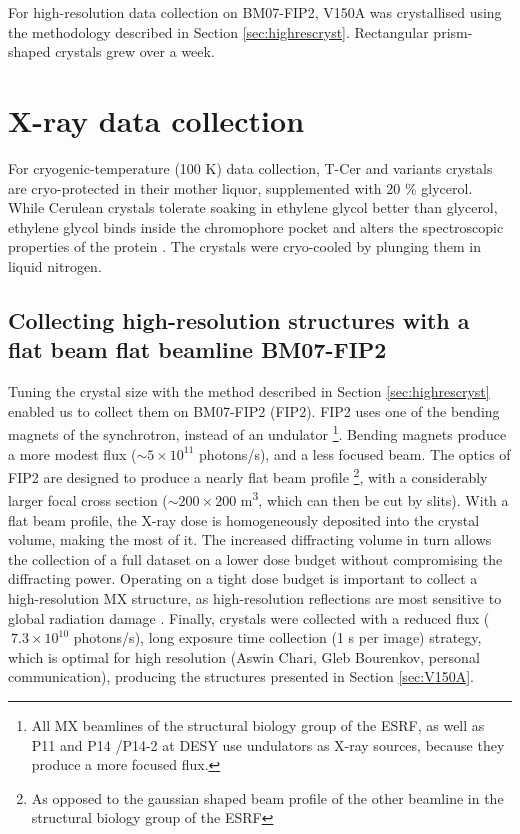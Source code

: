 For high-resolution data collection on BM07-FIP2, V150A was crystallised using the methodology described in Section \ref{sec:highrescryst}. Rectangular prism-shaped crystals grew over a week.

\section{X-ray data collection}
For cryogenic-temperature (100 K) data collection, T-Cer and variants crystals are cryo-protected in their mother liquor, supplemented with 20 \% glycerol. While Cerulean crystals tolerate soaking in ethylene glycol better than glycerol, ethylene glycol binds inside the chromophore pocket and alters the spectroscopic properties of the protein \parencite{vonstettenAlterationFluorescentProtein2012}. The crystals were cryo-cooled by plunging them in liquid nitrogen. 

\subsection{Collecting high-resolution structures with a flat beam flat beamline BM07-FIP2}\label{sec:highrescol}
Tuning the crystal size with the method described in Section \ref{sec:highrescryst} enabled us to collect them on BM07-FIP2 (FIP2). FIP2 uses one of the bending magnets of the synchrotron, instead of an undulator \footnote{All MX beamlines of the structural biology group of the ESRF, as well as P11 and P14 /P14-2 at DESY use undulators as X-ray sources, because they produce a more focused flux.}. Bending magnets produce a more modest flux (\(\sim5 \times 10^{11}\) photons/s), and a less focused beam. The optics of FIP2 are designed to produce a nearly flat beam profile \footnote{As opposed to the gaussian shaped beam profile of the other beamline in the structural biology group of the ESRF}, with a considerably larger focal cross section (\(\sim200 \times 200 \) \textmu m\textsuperscript{3}, which can then be cut by slits). With a flat beam profile, the X-ray dose is homogeneously deposited into the crystal volume, making the most of it. The increased diffracting volume in turn allows the collection of a full dataset on a lower dose budget without compromising the diffracting power. Operating on a tight dose budget is important to collect a high-resolution MX structure, as high-resolution reflections are most sensitive to global radiation damage \parencite{garmanRadiationDamageMacromolecular2010}. Finally, crystals were collected with a reduced flux (\(\ 7.3 \times 10^{10}\) photons/s), long exposure time collection (1 s per image) strategy, which is optimal for high resolution (Aswin Chari, Gleb Bourenkov, personal communication), producing the structures presented in Section \ref{sec:V150A}.

